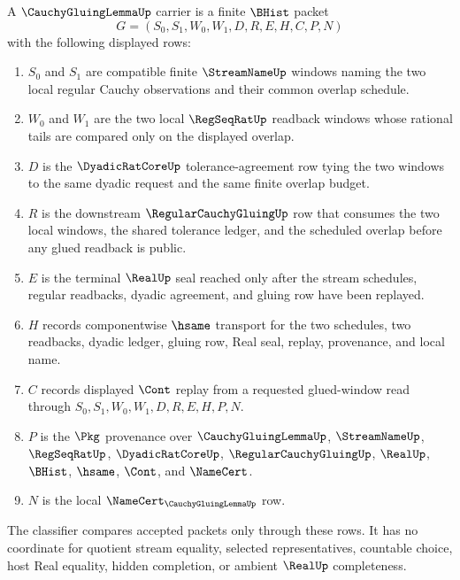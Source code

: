 \begin{definition}
\label{def:cauchy-gluing-lemma-carrier}
A $\CauchyGluingLemmaUp$ carrier is a finite $\BHist$ packet
$$
G=(S_0,S_1,W_0,W_1,D,R,E,H,C,P,N)
$$
with the following displayed rows:
\begin{enumerate}
\item $S_0$ and $S_1$ are compatible finite $\StreamNameUp$ windows naming the two local regular Cauchy observations and their common overlap schedule.
\item $W_0$ and $W_1$ are the two local $\RegSeqRatUp$ readback windows whose rational tails are compared only on the displayed overlap.
\item $D$ is the $\DyadicRatCoreUp$ tolerance-agreement row tying the two windows to the same dyadic request and the same finite overlap budget.
\item $R$ is the downstream $\RegularCauchyGluingUp$ row that consumes the two local windows, the shared tolerance ledger, and the scheduled overlap before any glued readback is public.
\item $E$ is the terminal $\RealUp$ seal reached only after the stream schedules, regular readbacks, dyadic agreement, and gluing row have been replayed.
\item $H$ records componentwise $\hsame$ transport for the two schedules, two readbacks, dyadic ledger, gluing row, Real seal, replay, provenance, and local name.
\item $C$ records displayed $\Cont$ replay from a requested glued-window read through $S_0,S_1,W_0,W_1,D,R,E,H,P,N$.
\item $P$ is the $\Pkg$ provenance over $\CauchyGluingLemmaUp$, $\StreamNameUp$, $\RegSeqRatUp$, $\DyadicRatCoreUp$, $\RegularCauchyGluingUp$, $\RealUp$, $\BHist$, $\hsame$, $\Cont$, and $\NameCert$.
\item $N$ is the local $\NameCert_{\CauchyGluingLemmaUp}$ row.
\end{enumerate}
The classifier compares accepted packets only through these rows. It has no coordinate for quotient stream equality, selected representatives, countable choice, host Real equality, hidden completion, or ambient $\RealUp$ completeness.
\end{definition}


